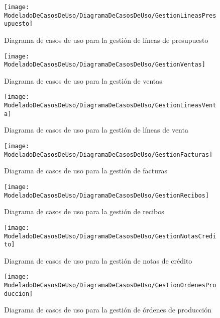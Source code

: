     \begin{figure}[H]
		\centering
		\texttt{[image: ModeladoDeCasosDeUso/DiagramaDeCasosDeUso/GestionLineasPresupuesto]}
		\caption{Diagrama de casos de uso para la gestión de líneas de presupuesto}
	\label{fig:GestionLineasPresupuesto}
    \end{figure}
    \begin{figure}[H]
		\centering
		\texttt{[image: ModeladoDeCasosDeUso/DiagramaDeCasosDeUso/GestionVentas]}
		\caption{Diagrama de casos de uso para la gestión de ventas}
	\label{fig:GestionVentas}
    \end{figure}
    \begin{figure}[H]
		\centering
		\texttt{[image: ModeladoDeCasosDeUso/DiagramaDeCasosDeUso/GestionLineasVenta]}
		\caption{Diagrama de casos de uso para la gestión de líneas de venta}
	\label{fig:GestionLineasVenta}
    \end{figure}
    \begin{figure}[H]
		\centering
		\texttt{[image: ModeladoDeCasosDeUso/DiagramaDeCasosDeUso/GestionFacturas]}
		\caption{Diagrama de casos de uso para la gestión de facturas}
	\label{fig:GestionFacturas}
    \end{figure}
    \begin{figure}[H]
		\centering
		\texttt{[image: ModeladoDeCasosDeUso/DiagramaDeCasosDeUso/GestionRecibos]}
		\caption{Diagrama de casos de uso para la gestión de recibos}
	\label{fig:GestionRecibos}
    \end{figure}
    \begin{figure}[H]
		\centering
		\texttt{[image: ModeladoDeCasosDeUso/DiagramaDeCasosDeUso/GestionNotasCredito]}
		\caption{Diagrama de casos de uso para la gestión de notas de crédito}
	\label{fig:GestionNotasCredito}
    \end{figure}
    \begin{figure}[H]
		\centering
		\texttt{[image: ModeladoDeCasosDeUso/DiagramaDeCasosDeUso/GestionOrdenesProduccion]}
		\caption{Diagrama de casos de uso para la gestión de órdenes de producción}
	\label{fig:GestionOrdenesProduccion}
    \end{figure}
